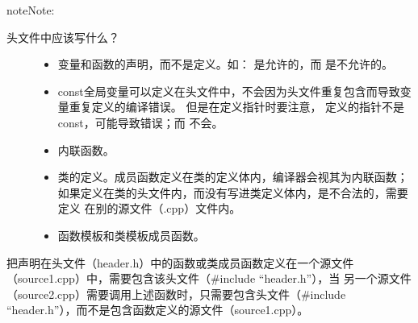 \documentclass[letterpaper,10pt,english]{sphinxmanual}
\begin{document}
\begin{sphinxadmonition}{note}{Note:}\begin{description}
\item[{头文件中应该写什么？}] \leavevmode\begin{itemize}
\item {} 
变量和函数的声明，而不是定义。如： 是允许的，而  是不允许的。

\item {} 
const全局变量可以定义在头文件中，不会因为头文件重复包含而导致变量重复定义的编译错误。
但是在定义指针时要注意，  定义的指针不是const，可能导致错误；而  不会。

\item {} 
内联函数。

\item {} 
类的定义。成员函数定义在类的定义体内，编译器会视其为内联函数；如果定义在类的头文件内，而没有写进类定义体内，是不合法的，需要定义
在别的源文件（.cpp）文件内。

\item {} 
函数模板和类模板成员函数。

\end{itemize}

\end{description}

把声明在头文件（header.h）中的函数或类成员函数定义在一个源文件（source1.cpp）中，需要包含该头文件（\#include “header.h”），当
另一个源文件（source2.cpp）需要调用上述函数时，只需要包含头文件（\#include “header.h”），而不是包含函数定义的源文件（source1.cpp）。
\end{sphinxadmonition}
\end{document}
